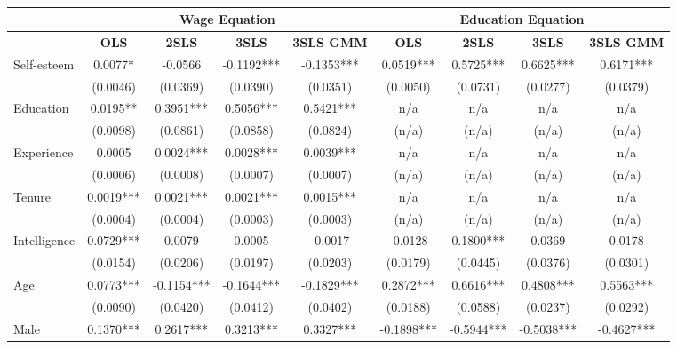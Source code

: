 \documentclass[12pt]{report}
\newcommand{\prbf}[1]{\textbf{#1}}
\begin{document}
\begin{comment}R-sq & 0.2879 & -0.2271 & -0.2629 & 0.2738 & 0.3142 & -0.6374 & -1.5467 & -0.3941\\
\end{comment}

\newpage
\begin{sidewaystable}
\small
\caption{\label{tab:wage80d}}
\vspace{2pt}
\centering\begin{tabular}{lc|c|c|c|c|c|c|c}
\hline
\hline
& \multicolumn{4}{|c|}{Wage Equation} & \multicolumn{4}{|c}{Education Equation}\\
\hline
& \prbf{OLS} & \prbf{2SLS} & \prbf{3SLS} & \prbf{3SLS GMM} & \prbf{OLS} & \prbf{2SLS} & \prbf{3SLS} & \prbf{3SLS GMM}\\
\hline
Self-esteem & 0.0077* & -0.0566 & -0.1192*** & -0.1353*** & 0.0519*** & 0.5725*** & 0.6625*** & 0.6171***\\
& (0.0046) & (0.0369) & (0.0390) & (0.0351) & (0.0050) & (0.0731) & (0.0277) & (0.0379)\\
Education & 0.0195** & 0.3951*** & 0.5056*** & 0.5421*** & n/a & n/a & n/a & n/a\\
& (0.0098) & (0.0861) & (0.0858) & (0.0824) & (n/a) & (n/a) & (n/a) & (n/a)\\
Experience & 0.0005 & 0.0024*** & 0.0028*** & 0.0039*** & n/a & n/a & n/a & n/a\\
& (0.0006) & (0.0008) & (0.0007) & (0.0007) & (n/a) & (n/a) & (n/a) & (n/a)\\
Tenure & 0.0019*** & 0.0021*** & 0.0021*** & 0.0015*** & n/a & n/a & n/a & n/a\\
& (0.0004) & (0.0004) & (0.0003) & (0.0003) & (n/a) & (n/a) & (n/a) & (n/a)\\
Intelligence & 0.0729*** & 0.0079 & 0.0005 & -0.0017 & -0.0128 & 0.1800*** & 0.0369 & 0.0178\\
& (0.0154) & (0.0206) & (0.0197) & (0.0203) & (0.0179) & (0.0445) & (0.0376) & (0.0301)\\
Age & 0.0773*** & -0.1154*** & -0.1644*** & -0.1829*** & 0.2872*** & 0.6616*** & 0.4808*** & 0.5563***\\
& (0.0090) & (0.0420) & (0.0412) & (0.0402) & (0.0188) & (0.0588) & (0.0237) & (0.0292)\\
Male & 0.1370*** & 0.2617*** & 0.3213*** & 0.3327*** & -0.1898*** & -0.5944*** & -0.5038*** & -0.4627***\\

\end{tabular}
\end{sidewaystable}
\end{document}
